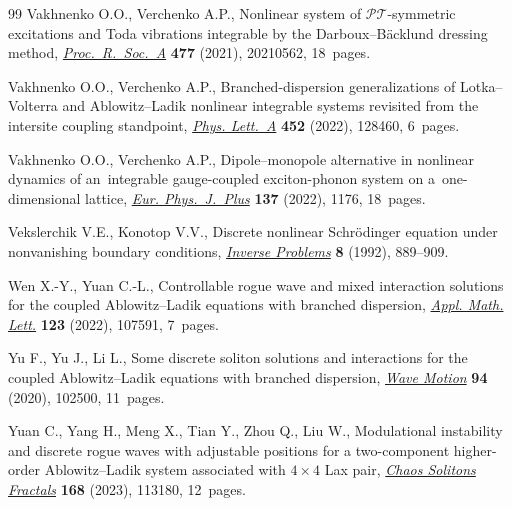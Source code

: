 \documentclass[pdftex]{sigma}
\numberwithin{equation}{section}
\begin{document}
\begin{thebibliography}{99}
Vakhnenko O.O., Verchenko A.P., Nonlinear system of {$\mathcal{PT}$}-symmetric
 excitations and {T}oda vibrations integrable by the {D}arboux--{B}\"acklund
 dressing method,
 \href{https://doi.org/10.1098/rspa.2021.0562}{\textit{Proc.~R.~Soc.~A}} \textbf{477}
 (2021), 20210562, 18~pages.

Vakhnenko O.O., Verchenko A.P., Branched-dispersion generalizations of
 {L}otka--{V}olterra and {A}blowitz--{L}adik nonlinear integrable systems
 revisited from the intersite coupling standpoint,
 \href{https://doi.org/10.1016/j.physleta.2022.128460}{\textit{Phys. Lett.~A}}
 \textbf{452} (2022), 128460, 6~pages.

Vakhnenko O.O., Verchenko A.P., Dipole--monopole alternative in nonlinear
 dynamics of an~integrable gauge-coupled exciton-phonon system on
 a~one-dimensional lattice,
 \href{https://doi.org/10.1140/epjp/s13360-022-03335-w}{\textit{Eur.
 Phys.~J.~Plus}} \textbf{137} (2022), 1176, 18~pages.

Vekslerchik V.E., Konotop V.V., Discrete nonlinear {S}chr\"odinger equation
 under nonvanishing boundary conditions,
 \href{https://doi.org/10.1088/0266-5611/8/6/007}{\textit{Inverse Problems}}
 \textbf{8} (1992), 889--909.

Wen X.-Y., Yuan C.-L., Controllable rogue wave and mixed interaction solutions
 for the coupled {A}blowitz--{L}adik equations with branched dispersion,
 \href{https://doi.org/10.1016/j.aml.2021.107591}{\textit{Appl. Math. Lett.}}
 \textbf{123} (2022), 107591, 7~pages.

Yu F., Yu J., Li L., Some discrete soliton solutions and interactions for the
 coupled {A}blowitz--{L}adik equations with branched dispersion,
 \href{https://doi.org/10.1016/j.wavemoti.2019.102500}{\textit{Wave Motion}}
 \textbf{94} (2020), 102500, 11~pages.

Yuan C., Yang H., Meng X., Tian Y., Zhou Q., Liu W., Modulational instability
 and discrete rogue waves with adjustable positions for a two-component
 higher-order {A}blowitz--{L}adik system associated with {$4\times 4$} {L}ax
 pair, \href{https://doi.org/10.1016/j.chaos.2023.113180}{\textit{Chaos
 Solitons Fractals}} \textbf{168} (2023), 113180, 12~pages.

\end{thebibliography}\LastPageEnding
\end{document}

